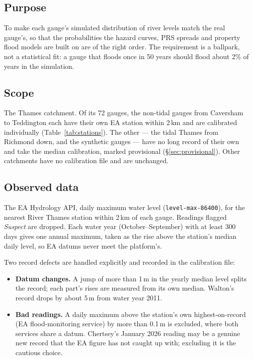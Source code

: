\documentclass[11pt,a4paper]{article}
\begin{document}
\mkmpurpose

\subsection{Purpose}
To make each gauge's simulated distribution of river levels match the real gauge's, so that
the probabilities the hazard curves, PRS spreads and property flood models are built on are
of the right order. The requirement is a ballpark, not a statistical fit: a gauge that
floods once in 50 years should flood about 2\% of years in the simulation.

\subsection{Scope}
The Thames catchment. Of its 72 gauges, the \gcNCal{} non-tidal gauges from Caversham to
Teddington each have their own EA station within 2\,km and are calibrated individually
(Table~\ref{tab:stations}). The other \gcNProv{} --- the tidal Thames from Richmond down,
and the synthetic gauges --- have no long record of their own and take the median
calibration, marked provisional (\S\ref{sec:provisional}). Other catchments have no
calibration file and are unchanged.

\mkminputs

\subsection{Observed data}
The EA Hydrology API, daily maximum water level (\texttt{level-max-86400}), for the nearest
River Thames station within 2\,km of each gauge. Readings flagged \emph{Suspect} are dropped.
Each water year (October--September) with at least 300 days gives one annual maximum, taken
as the rise above the station's median daily level, so EA datums never meet the platform's.

Two record defects are handled explicitly and recorded in the calibration file:
\begin{itemize}[nosep]
    \item \textbf{Datum changes.} A jump of more than 1\,m in the yearly median level splits
          the record; each part's rises are measured from its own median. Walton's record
          drops by about 5\,m from water year 2011.
    \item \textbf{Bad readings.} A daily maximum above the station's own highest-on-record
          (EA flood-monitoring service) by more than 0.1\,m is excluded, where both services
          share a datum. Chertsey's January 2026 reading may be a genuine new record that the
          EA figure has not caught up with; excluding it is the cautious choice.
\end{itemize}
\end{document}
